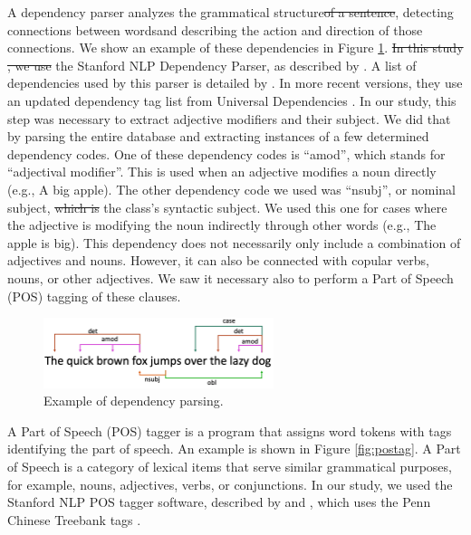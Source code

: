 \documentclass[smallextended,natbib]{svjour3}       %
\providecommand{\DIFadd}[1]{{\protect\color{blue}\uwave{#1}}} %
\providecommand{\DIFdel}[1]{{\protect\color{red}\sout{#1}}}                      %
\providecommand{\DIFaddbegin}{} %
\providecommand{\DIFaddend}{} %
\providecommand{\DIFdelbegin}{} %
\providecommand{\DIFdelend}{} %
\newcommand{\DIFscaledelfig}{0.5}
\newlength{\DIFdelgraphicswidth} %
\newlength{\DIFdelgraphicsheight} %
\newcommand{\DIFaddincludegraphics}[2][]{{\color{blue}\fbox{\DIFOincludegraphics[#1]{#2}}}} %
\newcommand{\DIFdelincludegraphics}[2][]{%
\sbox{\DIFdelgraphicsbox}{\DIFOincludegraphics[#1]{#2}}%
\settoboxwidth{\DIFdelgraphicswidth}{\DIFdelgraphicsbox} %
\settoboxtotalheight{\DIFdelgraphicsheight}{\DIFdelgraphicsbox} %
\scalebox{\DIFscaledelfig}{%
\parbox[b]{\DIFdelgraphicswidth}{\usebox{\DIFdelgraphicsbox}\\[-\baselineskip] \rule{\DIFdelgraphicswidth}{0em}}\llap{\resizebox{\DIFdelgraphicswidth}{\DIFdelgraphicsheight}{%
\setlength{\unitlength}{\DIFdelgraphicswidth}%
\begin{picture}(1,1)%
\thicklines\linethickness{2pt} %
{\color[rgb]{1,0,0}\put(0,0){\framebox(1,1){}}}%
{\color[rgb]{1,0,0}\put(0,0){\line( 1,1){1}}}%
{\color[rgb]{1,0,0}\put(0,1){\line(1,-1){1}}}%
\end{picture}%
}\hspace*{3pt}}} %
} %
\DeclareRobustCommand{\DIFaddbegin}{\DIFOaddbegin \let\includegraphics\DIFaddincludegraphics} %
\DeclareRobustCommand{\DIFaddend}{\DIFOaddend \let\includegraphics\DIFOincludegraphics} %
\DeclareRobustCommand{\DIFdelbegin}{\DIFOdelbegin \let\includegraphics\DIFdelincludegraphics} %
\DeclareRobustCommand{\DIFdelend}{\DIFOaddend \let\includegraphics\DIFOincludegraphics} %
\begin{document}
    A dependency parser analyzes the grammatical structure\DIFdelbegin \DIFdel{of a sentence}\DIFdelend , detecting connections between words\DIFaddbegin \DIFadd{, }\DIFaddend and describing the action and direction of those connections. We show an example of these dependencies in Figure \ref{fig:depparse}. \DIFdelbegin \DIFdel{In this study , we use }\DIFdelend \DIFaddbegin \DIFadd{This study uses }\DIFaddend the Stanford NLP Dependency Parser, as described by \cite{chen-EMNLP:2014}. A list of dependencies used by this parser is detailed by \cite{marneffe_manning_2016_depparse_manual}. In more recent versions, they use an updated dependency tag list from Universal Dependencies \cite[][]{zeman2018conll}. In our study, this step was necessary to extract adjective modifiers and their subject. We did that by parsing the entire database and extracting instances of a few determined dependency codes. One of these dependency codes is ``amod'', which stands for ``adjectival modifier''. This is used when an adjective modifies a noun directly (e.g., A big apple). The other dependency code we used was ``nsubj'', or nominal subject, \DIFdelbegin \DIFdel{which is }\DIFdelend the class's syntactic subject. We used this one for cases where the adjective is modifying the noun indirectly through other words (e.g., The apple is big). This dependency does not necessarily only include a combination of adjectives and nouns. However, it can also be connected with copular verbs, nouns, or other adjectives. We saw it necessary also to perform a Part of Speech (POS) tagging of these clauses.

    \begin{figure}[ht]
    \centering
    \includegraphics[width=0.6\textwidth]{depparse.png}
    \caption{Example of dependency parsing.}
    \label{fig:depparse}
    \end{figure}

    A Part of Speech (POS) tagger is a program that assigns word tokens with tags identifying the part of speech. An example is shown in Figure \ref{fig:postag}. A Part of Speech is a category of lexical items that serve similar grammatical purposes, for example, nouns, adjectives, verbs, or conjunctions. In our study, we used the Stanford NLP POS tagger software, described by \cite{toutanova2000enriching} and \cite{toutanova2003feature}, which uses the Penn Chinese Treebank tags \cite[][]{xia_penntreebank}.
\end{document}
